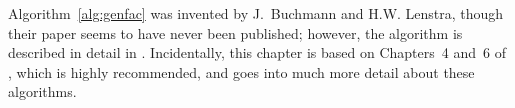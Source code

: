 Algorithm~\ref{alg:genfac} was invented by J.~Buchmann and
H.\thinspace{}W. Lenstra, though their paper seems to have never been
published; however, the algorithm is described in detail in
\cite[\S6.2.5]{cohen:course_ant}.  Incidentally, this chapter is based
on Chapters~4 and~6 of \cite{cohen:course_ant}, which is highly
recommended, and goes into much more detail about these algorithms.


